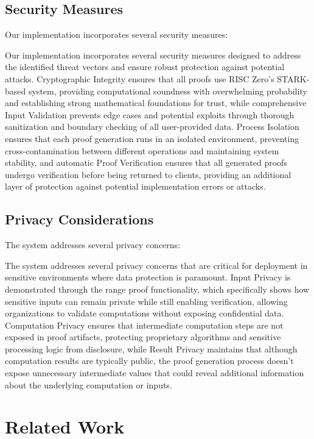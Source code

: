 \documentclass[11pt]{article}
\begin{document}
\subsection{Security Measures}

Our implementation incorporates several security measures:

Our implementation incorporates several security measures designed to address the identified threat vectors and ensure robust protection against potential attacks. Cryptographic Integrity ensures that all proofs use RISC Zero's STARK-based system, providing computational soundness with overwhelming probability and establishing strong mathematical foundations for trust, while comprehensive Input Validation prevents edge cases and potential exploits through thorough sanitization and boundary checking of all user-provided data. Process Isolation ensures that each proof generation runs in an isolated environment, preventing cross-contamination between different operations and maintaining system stability, and automatic Proof Verification ensures that all generated proofs undergo verification before being returned to clients, providing an additional layer of protection against potential implementation errors or attacks.

\subsection{Privacy Considerations}

The system addresses several privacy concerns:

The system addresses several privacy concerns that are critical for deployment in sensitive environments where data protection is paramount. Input Privacy is demonstrated through the range proof functionality, which specifically shows how sensitive inputs can remain private while still enabling verification, allowing organizations to validate computations without exposing confidential data. Computation Privacy ensures that intermediate computation steps are not exposed in proof artifacts, protecting proprietary algorithms and sensitive processing logic from disclosure, while Result Privacy maintains that although computation results are typically public, the proof generation process doesn't expose unnecessary intermediate values that could reveal additional information about the underlying computation or inputs.

\section{Related Work}
\label{sec:related}
\end{document}
